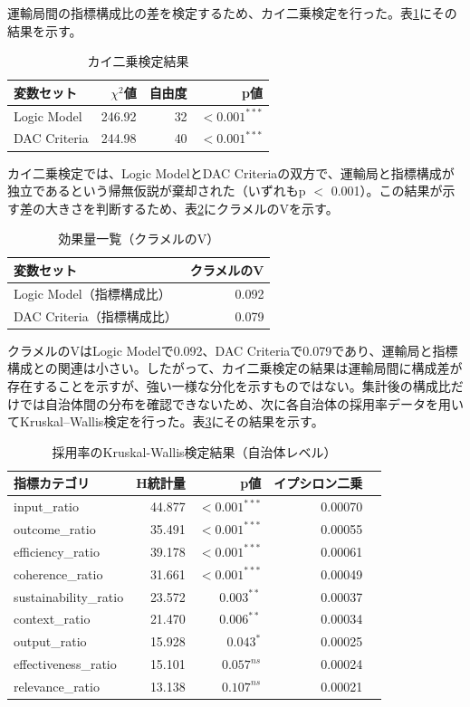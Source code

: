 運輸局間の指標構成比の差を検定するため、カイ二乗検定を行った。表\ref{tab:chi_square}にその結果を示す。

\begin{table}[htbp]
\caption{カイ二乗検定結果}
\label{tab:chi_square}
\centering
\begin{tabular}{lrrr}
\toprule
変数セット & $\chi^2$値 & 自由度 & p値 \\
\midrule
Logic Model & 246.92 & 32 & $<0.001^{***}$ \\
DAC Criteria & 244.98 & 40 & $<0.001^{***}$ \\
\bottomrule
\end{tabular}
\end{table}

カイ二乗検定では、Logic ModelとDAC Criteriaの双方で、運輸局と指標構成が独立であるという帰無仮説が棄却された（いずれもp $<$ 0.001）。この結果が示す差の大きさを判断するため、表\ref{tab:cramers_v}にクラメルのVを示す。

\begin{table}[htbp]
\caption{効果量一覧（クラメルのV）}
\label{tab:cramers_v}
\centering
\begin{tabular}{lr}
\toprule
変数セット & クラメルのV \\
\midrule
Logic Model（指標構成比） & 0.092 \\
DAC Criteria（指標構成比） & 0.079 \\
\bottomrule
\end{tabular}
\end{table}

クラメルのVはLogic Modelで0.092、DAC Criteriaで0.079であり、運輸局と指標構成との関連は小さい。したがって、カイ二乗検定の結果は運輸局間に構成差が存在することを示すが、強い一様な分化を示すものではない。集計後の構成比だけでは自治体間の分布を確認できないため、次に各自治体の採用率データを用いてKruskal--Wallis検定を行った。表\ref{tab:kruskal_wallis}にその結果を示す。

\begin{table}[htbp]
\caption{採用率のKruskal-Wallis検定結果（自治体レベル）}
\label{tab:kruskal_wallis}
\centering
\begin{tabular}{lrrrl}
\toprule
指標カテゴリ & H統計量 & p値 & イプシロン二乗 \\
\midrule
input\_ratio & 44.877 & $<0.001^{***}$ & 0.00070 \\
outcome\_ratio & 35.491 & $<0.001^{***}$ & 0.00055 \\
efficiency\_ratio & 39.178 & $<0.001^{***}$ & 0.00061 \\
coherence\_ratio & 31.661 & $<0.001^{***}$ & 0.00049 \\
sustainability\_ratio & 23.572 & $0.003^{**}$ & 0.00037 \\
context\_ratio & 21.470 & $0.006^{**}$ & 0.00034 \\
output\_ratio & 15.928 & $0.043^{*}$ & 0.00025 \\
effectiveness\_ratio & 15.101 & $0.057^{ns}$ & 0.00024 \\
relevance\_ratio & 13.138 & $0.107^{ns}$ & 0.00021 \\
\bottomrule
\end{tabular}
\end{table}

